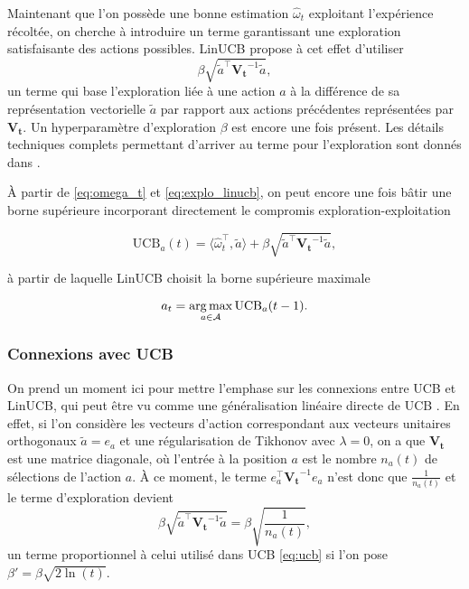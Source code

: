 Maintenant que l'on possède une bonne estimation $\hat{\omega}_t$ 
exploitant l'expérience récoltée, on cherche à introduire un terme garantissant une exploration 
satisfaisante des actions possibles.
LinUCB propose à cet effet d'utiliser 
\begin{equation}
    \beta\sqrt{\tilde{a}^\top \mathbf{V_t}^{-1} \tilde{a}},
    \label{eq:explo_linucb}
\end{equation}
un terme qui base l'exploration liée à une action $a$ à la différence de sa 
représentation vectorielle $\tilde{a}$ par rapport 
aux actions précédentes représentées par $\mathbf{V_t}$.
Un hyperparamètre d'exploration $\beta$ est encore une fois présent.
Les détails techniques complets permettant d'arriver au terme pour l'exploration sont 
donnés dans \citep{abbasi2011improved}.

À partir de \eqref{eq:omega_t} et \eqref{eq:explo_linucb}, on peut encore une fois 
bâtir une borne supérieure incorporant directement le compromis exploration-exploitation 

\begin{equation}
    \text{UCB}_a(t) = \langle \hat{\omega}_t^\top, \tilde{a} \rangle +  \beta\sqrt{\tilde{a}^\top \mathbf{V_t}^{-1} \tilde{a}},
    \label{eq:linucb}
\end{equation}

à partir de laquelle LinUCB choisit la borne supérieure maximale 

\begin{equation*}
    a_t = \operatorname*{arg\,max}_{a \in \mathcal{A}} \text{UCB}_a(t-1).
    \label{eq:linucb_selection}
\end{equation*}



\subsubsection*{Connexions avec UCB}

On prend un moment ici pour mettre l'emphase sur les connexions entre UCB et 
LinUCB, qui peut être vu comme une généralisation linéaire directe de UCB
 \citep{banditalgs}. 
En effet, si l'on considère les vecteurs d'action correspondant aux vecteurs unitaires
orthogonaux $\tilde{a} = e_a$ et une régularisation de Tikhonov avec $\lambda = 0$, on 
a que $\mathbf{V_t}$ est une matrice diagonale, où l'entrée à la position $a$ est le
nombre $n_a(t)$ de sélections de l'action $a$.
À ce moment, le terme $e_a^\top \mathbf{V_t}^{-1} e_a$ n'est 
donc que $\frac{1}{n_a(t)}$ et le 
terme d'exploration devient
\begin{equation*}
    \beta\sqrt{\tilde{a}^\top \mathbf{V_t}^{-1} \tilde{a}} = \beta\sqrt{\frac{1}{n_a(t)}},
\end{equation*}
un terme proportionnel à celui utilisé dans UCB \eqref{eq:ucb}
si l'on pose $\beta' = \beta\sqrt{2\ln(t)}$.

